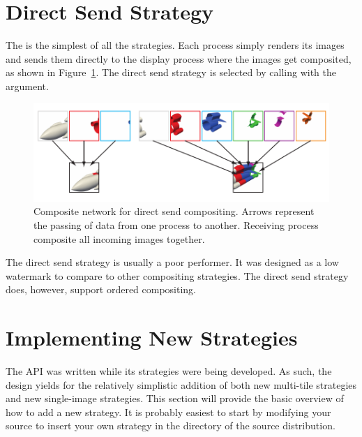 
\section{Direct Send Strategy}
\label{sec:Strategies:DirectSend}


The  is the simplest of all the strategies.
Each process simply renders its images and sends them directly to the
display process where the images get composited, as shown in
Figure~\ref{fig:DirectSend}.  The direct send strategy is selected by
calling  with the 
argument.

\begin{figure}
  \centering
  \includegraphics{images/DirectSend}
  \caption[Direct send compositing network.]{Composite network for direct
    send compositing.  Arrows represent the passing of data from one
    process to another.  Receiving process composite all incoming images
    together.}
  \label{fig:DirectSend}
\end{figure}

The direct send strategy is usually a poor performer.  It was designed as a
low watermark to compare to other compositing strategies.  The direct send
strategy does, however, support ordered compositing.


\section{Implementing New Strategies}
\label{sec:Strategies:New}

The \IceT API was written while its strategies were being developed.  As
such, the design yields for the relatively simplistic addition of both new
multi-tile strategies and new single-image strategies.  This section will
provide the basic overview of how to add a new strategy.  It is probably
easiest to start by modifying your \IceT source to insert your own strategy
in the  directory of the \IceT source distribution.

